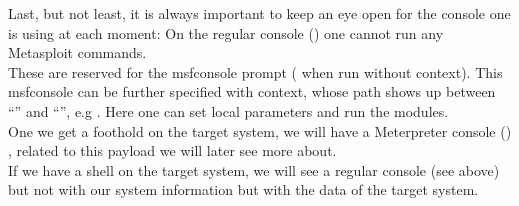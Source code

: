 {Last, but not least, it is always important to keep an eye open for the console one is using at each moment: 
On the regular console () one cannot run any Metasploit commands.\\
These are reserved for the msfconsole prompt ( when run without context). This msfconsole can be further specified with context, whose path shows up between ``'' and ``\cd{>}'', e.g . Here one can set local parameters and run the modules. \\
One we get a foothold on the target system, we will have a Meterpreter console () , related to this payload we will later see more about.\\
If we have a shell on the target system, we will see a regular console (see above) but not with our system information but with the data of the target system.\\


}